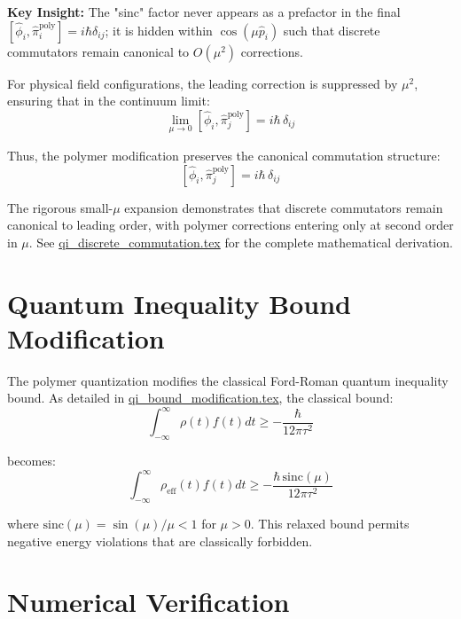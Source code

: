 \documentclass[12pt]{article}
\begin{document}
\textbf{Key Insight:} The "sinc" factor never appears as a prefactor in the final $[\hat{\phi}_i, \hat{\pi}_i^{\text{poly}}] = i\hbar\delta_{ij}$; it is hidden within $\cos(\mu \hat{p}_i)$ such that discrete commutators remain canonical to $O(\mu^2)$ corrections.

For physical field configurations, the leading correction is suppressed by $\mu^2$, ensuring that in the continuum limit:
\begin{equation}
\lim_{\mu \to 0} [\hat{\phi}_i, \hat{\pi}_j^{\text{poly}}] = i\hbar\,\delta_{ij}
\end{equation}

Thus, the polymer modification preserves the canonical commutation structure:
\begin{equation}
\boxed{[\hat{\phi}_i, \hat{\pi}_j^{\text{poly}}] = i\hbar\,\delta_{ij}}
\end{equation}

The rigorous small-$\mu$ expansion demonstrates that discrete commutators remain canonical to leading order, with polymer corrections entering only at second order in $\mu$. See \href{file:qi_discrete_commutation.tex}{qi\_discrete\_commutation.tex} for the complete mathematical derivation.

\section{Quantum Inequality Bound Modification}

The polymer quantization modifies the classical Ford-Roman quantum inequality bound. As detailed in \href{file:qi_bound_modification.tex}{qi\_bound\_modification.tex}, the classical bound:
\begin{equation}
\int_{-\infty}^{\infty} \rho(t) f(t) dt \geq -\frac{\hbar}{12\pi\tau^2}
\end{equation}

becomes:
\begin{equation}
\int_{-\infty}^{\infty} \rho_{\text{eff}}(t) f(t) dt \geq -\frac{\hbar\,\mathrm{sinc}(\mu)}{12\pi\tau^2}
\end{equation}

where $\mathrm{sinc}(\mu) = \sin(\mu)/\mu < 1$ for $\mu > 0$. This relaxed bound permits negative energy violations that are classically forbidden.

\section{Numerical Verification}
\end{document}
